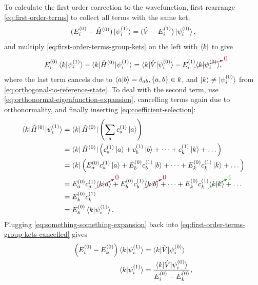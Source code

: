 \documentclass[%
class = book,%
crop = false,%
float = true,%
multi = true,%
preview = false,%
]{standalone}
\begin{document}
To calculate the first-order correction to the wavefunction, first rearrange \eqref{eq:first-order-terms} to collect all terms with the same ket,
\begin{equation}
  \label{eq:first-order-terms-group-kets}
  ( E_{i}^{(0)} - \hat{H}^{(0)} ) \ket{\psi_{i}^{(1)}} = ( \hat{V} - E_{i}^{(1)} ) \ket{\psi_{i}^{(0)}},
\end{equation}
and multiply \eqref{eq:first-order-terms-group-kets} on the left with \(\bra{k}\) to give
\begin{equation}
  \label{eq:first-order-terms-group-kets-cancelled}
  E_{i}^{(0)} \braket{k|\psi_{i}^{(1)}} - \braket{k|\hat{H}^{(0)}|\psi_{i}^{(1)}} = \braket{k|\hat{V}|\psi_{i}^{(0)}} - E_{i}^{(1)} \Ccancelto[carmine]{0}{\braket{k|\psi_{i}^{(0)}}},
\end{equation}
where the last term cancels due to \(\braket{a|b} = \delta_{ab}, \{a,b\}\in k\), and \(\ket{k} \neq \ket{\psi_{i}^{(0)}}\) from \eqref{eq:orthogonal-to-reference-state}. To deal with the second term, use \eqref{eq:orthonormal-eigenfunction-expansion}, cancelling terms again due to orthonormality, and finally inserting \eqref{eq:coefficient-selection}:
\begin{equation}
  \label{eq:something-something-expansion}
  \begin{aligned}
    \braket{k|\hat{H}^{(0)}|\psi_{i}^{(1)}} &= \bra{k} \hat{H}^{(0)} | \left( \sum_{a} c_{a}^{(1)} \ket{a} \right) \\
      &= \bra{k} \hat{H}^{(0)}| \left( c_{a}^{(1)} \ket{a} + c_{b}^{(1)} \ket{b} + \dots + c_{k}^{(1)} \ket{k} + \dots \right) \\
      &= \bra{k} \left( E_{a}^{(0)} c_{a}^{(1)} \ket{a} + E_{b}^{(0)} c_{b}^{(1)} \ket{b} + \dots + E_{k}^{(0)} c_{k}^{(1)} \ket{k} + \dots \right) \\
      &= E_{a}^{(0)} c_{a}^{(1)} \Ccancelto[carmine]{0}{\braket{k|a}} + E_{b}^{(0)} c_{b}^{(1)} \Ccancelto[carmine]{0}{\braket{k|b}} + \dots + E_{k}^{(0)} c_{k}^{(1)} \Ccancelto[Green]{1}{\braket{k|k}} + \dots \\
      &= E_{k}^{(0)} c_{k}^{(1)} \\
      &= E_{k}^{(0)} \braket{k|\psi_{i}^{(1)}}.
    \end{aligned}
\end{equation}
Plugging \eqref{eq:something-something-expansion} back into \eqref{eq:first-order-terms-group-kets-cancelled} gives
\begin{align}
  \label{eq:szabo-ostlund-6.11}
  \left( E_{i}^{(0)} - E_{k}^{(0)} \right) \braket{k|\psi_{i}^{(1)}} &= \braket{k|\hat{V}|\psi_{i}^{(0)}} \\
  \label{eq:szabo-ostlund-6.11nl}
  \braket{k|\psi_{i}^{(1)}} &= \frac{\braket{k|\hat{V}|\psi_{i}^{(0)}}}{E_{i}^{(0)} - E_{k}^{(0)}},
\end{align}
\end{document}
